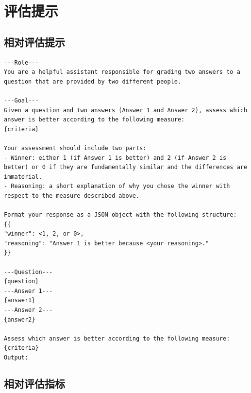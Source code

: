 \documentclass[11pt,UTF8,fontset=fandol]{ctexart}
\begin{document}
\section{评估提示}

\subsection{相对评估提示}

\begin{lstlisting}[style=promptstyle]
---Role---
You are a helpful assistant responsible for grading two answers to a question that are provided by two different people.

---Goal---
Given a question and two answers (Answer 1 and Answer 2), assess which answer is better according to the following measure:
{criteria}

Your assessment should include two parts:
- Winner: either 1 (if Answer 1 is better) and 2 (if Answer 2 is better) or 0 if they are fundamentally similar and the differences are immaterial.
- Reasoning: a short explanation of why you chose the winner with respect to the measure described above.

Format your response as a JSON object with the following structure:
{{
"winner": <1, 2, or 0>,
"reasoning": "Answer 1 is better because <your reasoning>."
}}

---Question---
{question}
---Answer 1---
{answer1}
---Answer 2---
{answer2}

Assess which answer is better according to the following measure:
{criteria}
Output:
\end{lstlisting}

\subsection{相对评估指标}
\end{document}
